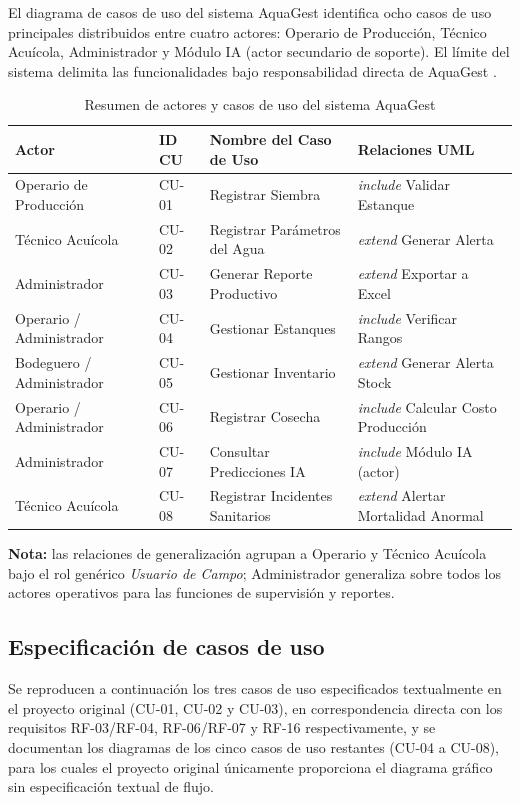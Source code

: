 \documentclass[12pt,a4paper]{article}
\begin{document}
El diagrama de casos de uso del sistema AquaGest identifica ocho casos de uso
principales distribuidos entre cuatro actores: Operario de Producción, Técnico
Acuícola, Administrador y Módulo IA (actor secundario de soporte). El límite
del sistema delimita las funcionalidades bajo responsabilidad directa de
AquaGest \cite{ISO29148:2018,SWEBOK2024}.

\begin{table}[H]
\centering
\caption{Resumen de actores y casos de uso del sistema AquaGest}
\begin{tabular}{|p{2.8cm}|p{1.5cm}|p{5.5cm}|p{4.2cm}|}
\hline
\textbf{Actor} & \textbf{ID CU} & \textbf{Nombre del Caso de Uso} & \textbf{Relaciones UML} \\
\hline
Operario de Producción & CU-01 & Registrar Siembra & \textit{include} Validar Estanque \\
\hline
Técnico Acuícola & CU-02 & Registrar Parámetros del Agua & \textit{extend} Generar Alerta \\
\hline
Administrador & CU-03 & Generar Reporte Productivo & \textit{extend} Exportar a Excel \\
\hline
Operario / Administrador & CU-04 & Gestionar Estanques & \textit{include} Verificar Rangos \\
\hline
Bodeguero / Administrador & CU-05 & Gestionar Inventario & \textit{extend} Generar Alerta Stock \\
\hline
Operario / Administrador & CU-06 & Registrar Cosecha & \textit{include} Calcular Costo Producción \\
\hline
Administrador & CU-07 & Consultar Predicciones IA & \textit{include} Módulo IA (actor) \\
\hline
Técnico Acuícola & CU-08 & Registrar Incidentes Sanitarios & \textit{extend} Alertar Mortalidad Anormal \\
\hline
\end{tabular}
\end{table}

\noindent\textbf{Nota:} las relaciones de generalización agrupan a Operario y
Técnico Acuícola bajo el rol genérico \textit{Usuario de Campo}; Administrador
generaliza sobre todos los actores operativos para las funciones de
supervisión y reportes.

\subsection{Especificación de casos de uso}

Se reproducen a continuación los tres casos de uso especificados
textualmente en el proyecto original (CU-01, CU-02 y CU-03), en
correspondencia directa con los requisitos RF-03/RF-04, RF-06/RF-07 y RF-16
respectivamente, y se documentan los diagramas de los cinco casos de uso
restantes (CU-04 a CU-08), para los cuales el proyecto original únicamente
proporciona el diagrama gráfico sin especificación textual de flujo.
\end{document}

